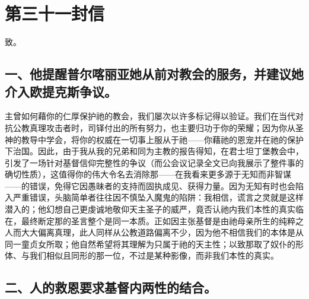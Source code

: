 
\section{第三十一封信}

致。\par


\subsection{一、他提醒普尔喀丽亚她从前对教会的服务，并建议她介入欧提克斯争议。}

主曾如何藉你的仁厚保护祂的教会，我们屡次以许多标记得以验证。我们在当代对抗公教真理攻击者时，司铎付出的所有努力，也主要归功于你的荣耀；因为你从圣神的教导中学会，将你的权威在一切事上服从于祂——你藉祂的恩宠并在祂的保护下治国。因此，由于我从我的兄弟和同为主教的报告得知，在君士坦丁堡教会中，引发了一场针对基督信仰完整性的争议（而公会议记录全文已向我展示了整件事的确切性质），这值得你的伟大令名去消除那——在我看来更多源于无知而非智谋——的错误，免得它因愚昧者的支持而固执成见、获得力量。因为无知有时也会陷入严重错误，头脑简单者往往因不慎坠入魔鬼的陷阱：我相信，谎言之灵就是这样潜入的；他幻想自己更虔诚地敬仰天主圣子的威严，竟否认祂内我们本性的真实临在，最终断定那的圣言整个是同一本质。正如因主张基督是由祂母亲所生的纯粹之人而大大偏离真理，此人同样从公教道路偏离不少，因为他不相信我们的本体是从同一童贞女所取；他自然希望将其理解为只属于祂的天主性；以致那取了奴仆的形体、与我们相似且同形的那一位，不过是某种影像，而非我们本性的真实。\par


\subsection{二、人的救恩要求基督内两性的结合。}

